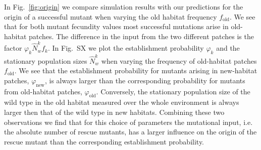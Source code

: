 \documentclass[11pt]{article}
\newcommand{\chg}[1]{\textcolor{change}{#1}}
\begin{document}
In Fig.~\ref{fig:origin} we compare simulation results with our predictions for the origin of a successful mutant when varying the old habitat frequency $f_{\text{old}}$. \chg{We see that for both mutant fecundity values most successful mutations arise in old-habitat patches. The difference in the input from the two different patches is the factor $\varphi_{k} \widehat{N}_w^k f_k$. In Fig.~SX we plot the establishment probability $\varphi_k$ and the stationary population sizes $\widehat{N}_w^k$ when varying the frequency of old-habitat patches $f_{\text{old}}$. We see that the establishment probability for mutants arising in new-habitat patches, $\varphi_{\text{new}}$, is always larger than the corresponding probability for mutants from old-habitat patches, $\varphi_{\text{old}}$. Conversely, the stationary population size of the wild type in the old habitat measured over the whole environment is always larger then that of the wild type in new habitats. Combining these two observations we find that for this choice of parameters the mutational input, i.e. the absolute number of rescue mutants, has a larger influence on the origin of the rescue mutant than the corresponding establishment probability.}

\end{document}
